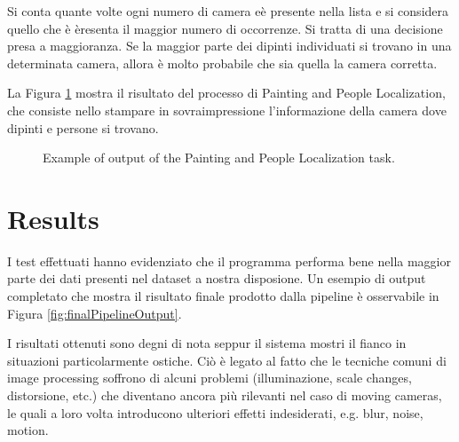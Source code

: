 \documentclass[10pt,twocolumn,letterpaper]{article}
\begin{document}
Si conta quante volte ogni numero di camera eè presente nella lista e si considera quello che è èresenta il maggior numero di occorrenze. Si tratta di una decisione presa a maggioranza. Se la maggior parte dei dipinti individuati si trovano in una determinata camera, allora è molto probabile che sia quella la camera corretta.

La Figura \ref{fig:paintingPeopleLocalization} mostra il risultato del processo di Painting and People Localization, che consiste nello stampare in sovraimpressione l'informazione della camera dove dipinti e persone si trovano.

\begin{figure}[t]
   \begin{center}
   \fbox{\rule{0pt}{2in} \rule{0.9\linewidth}{0pt}}
   \end{center}
      \caption{Example of output of the Painting and People Localization task.}
   \label{fig:paintingPeopleLocalization}
\end{figure}

\section{Results}

\begin{figure*}
   \begin{center}
   \fbox{\rule{0pt}{2in} \rule{.9\linewidth}{0pt}}
   \end{center}
      \caption{Example of final output produced by the proposed pipeline.}
   \label{fig:finalPipelineOutput}
\end{figure*}

I test effettuati hanno evidenziato che il programma performa bene nella maggior parte dei dati presenti nel dataset a nostra disposione. Un esempio di output completato che mostra il risultato finale prodotto dalla pipeline è osservabile in Figura \ref{fig:finalPipelineOutput}.

I risultati ottenuti sono degni di nota seppur il sistema mostri il fianco in situazioni particolarmente ostiche. Ciò è legato al fatto che le tecniche comuni di image processing soffrono di alcuni problemi (illuminazione, scale changes, distorsione, etc.) che diventano ancora più rilevanti nel caso di moving cameras, le quali a loro volta introducono ulteriori effetti indesiderati, e.g. blur, noise, motion. 
\end{document}
